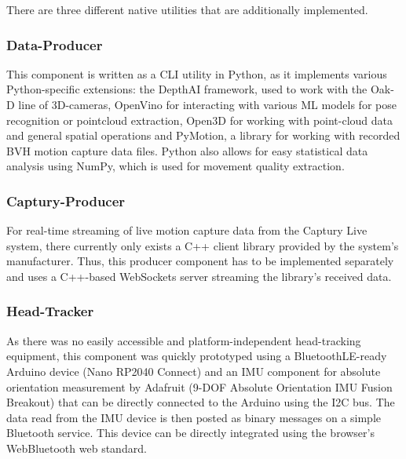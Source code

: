 There are three different native utilities that are additionally implemented.

\subsubsection{Data-Producer}

This component is written as a \ac{CLI} utility in Python, as it implements various Python-specific extensions: the DepthAI framework, used to work with the Oak-D line of \ac{3D}-cameras, OpenVino for interacting with various \ac{ML} models for pose recognition or pointcloud extraction, Open3D for working with point-cloud data and general spatial operations and PyMotion, a library for working with recorded \ac{BVH} motion capture data files. Python also allows for easy statistical data analysis using NumPy, which is used for movement quality extraction.

\subsubsection{Captury-Producer}

For real-time streaming of live motion capture data from the Captury Live system, there currently only exists a C++ client library provided by the system's manufacturer. Thus, this producer component has to be implemented separately and uses a C++-based WebSockets server streaming the library's received data.

\subsubsection{Head-Tracker}

As there was no easily accessible and platform-independent head-tracking equipment, this component was quickly prototyped using a BluetoothLE-ready Arduino device (Nano RP2040 Connect) and an \ac{IMU} component for absolute orientation measurement by Adafruit (9-DOF Absolute Orientation IMU Fusion Breakout) that can be directly connected to the Arduino using the \ac{I2C} bus. The data read from the \ac{IMU} device is then posted as binary messages on a simple Bluetooth service. This device can be directly integrated using the browser's WebBluetooth web standard.
